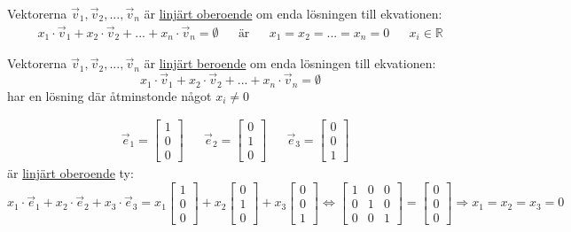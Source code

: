 \begin{Def}
	Vektorerna $\vec{v}_1, \vec{v}_2,...,\vec{v}_n$ är \underline{linjärt oberoende} om enda lösningen till ekvationen:
	\begin{align*}
	&&x_1 \cdot \vec{v}_1 + x_2 \cdot \vec{v}_2 + ... + x_n \cdot \vec{v}_n	= \emptyset
	&&\mbox{är}
	&&x_1 = x_2 = ... = x_n = 0
	&&x_i \in \mathbb{R}
	\end{align*}
	
\end{Def}
\begin{Def}
	Vektorerna $\vec{v}_1, \vec{v}_2,...,\vec{v}_n$ är \underline{linjärt beroende} om enda lösningen till ekvationen:
	\[
	x_1 \cdot \vec{v}_1 + x_2 \cdot \vec{v}_2 + ... + x_n \cdot \vec{v}_n	= \emptyset
	\]
	har en lösning där åtminstonde något $x_i \neq 0$
\end{Def}
\begin{Ex}
	\begin{align*}
	&\vec{e}_1 = \begin{bmatrix} 1\\0\\0 \end{bmatrix}
	&&\vec{e}_2 = \begin{bmatrix} 0\\1\\0 \end{bmatrix}
	&&\vec{e}_3	= \begin{bmatrix} 0\\0\\1 \end{bmatrix}
	\end{align*}
	är \underline{linjärt oberoende} ty:
	\[
	x_1 \cdot \vec{e}_1 + x_2 \cdot \vec{e}_2 + x_3 \cdot \vec{e}_3 = x_1 \begin{bmatrix} 1\\0\\0 \end{bmatrix} + x_2 \begin{bmatrix} 0\\1\\0 \end{bmatrix} + x_3 \begin{bmatrix} 0\\0\\1 \end{bmatrix} \Leftrightarrow \begin{bmatrix} 1&0&0\\0&1&0\\0&0&1 \end{bmatrix} = \begin{bmatrix} 0\\0\\0 \end{bmatrix} \Rightarrow x_1=x_2=x_3=0
	\]
\end{Ex}

